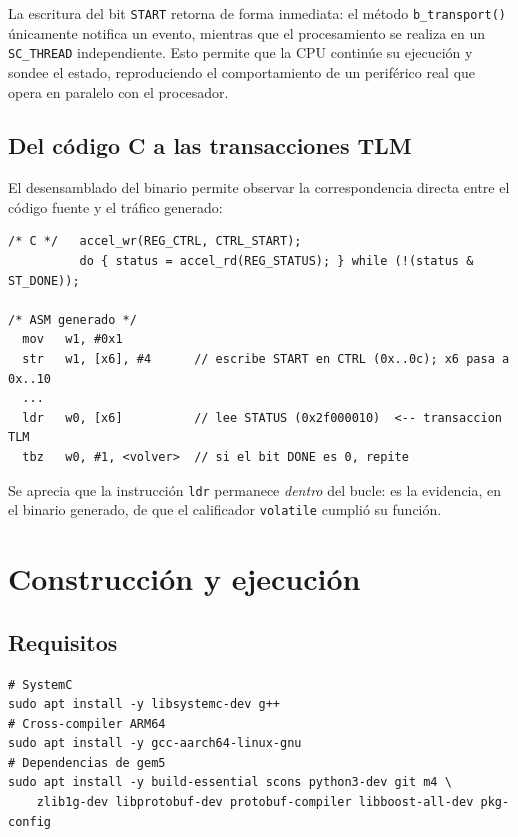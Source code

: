 \documentclass[11pt,letterpaper]{article}
\begin{document}
La escritura del bit \texttt{START} retorna de forma inmediata: el método
\texttt{b\_transport()} únicamente notifica un evento, mientras que el
procesamiento se realiza en un \texttt{SC\_THREAD} independiente. Esto permite
que la CPU continúe su ejecución y sondee el estado, reproduciendo el
comportamiento de un periférico real que opera en paralelo con el procesador.

\subsection{Del código C a las transacciones TLM}

El desensamblado del binario permite observar la correspondencia directa entre
el código fuente y el tráfico generado:

\begin{lstlisting}[style=consola,caption={Bucle de sondeo: codigo C y ensamblador ARM64 generado.}]
/* C */   accel_wr(REG_CTRL, CTRL_START);
          do { status = accel_rd(REG_STATUS); } while (!(status & ST_DONE));

/* ASM generado */
  mov   w1, #0x1
  str   w1, [x6], #4      // escribe START en CTRL (0x..0c); x6 pasa a 0x..10
  ...
  ldr   w0, [x6]          // lee STATUS (0x2f000010)  <-- transaccion TLM
  tbz   w0, #1, <volver>  // si el bit DONE es 0, repite
\end{lstlisting}

Se aprecia que la instrucción \texttt{ldr} permanece \emph{dentro} del bucle: es
la evidencia, en el binario generado, de que el calificador \texttt{volatile}
cumplió su función.

\section{Construcción y ejecución}

\subsection{Requisitos}

\begin{lstlisting}[style=shstyle,caption={Dependencias del entorno.}]
# SystemC
sudo apt install -y libsystemc-dev g++
# Cross-compiler ARM64
sudo apt install -y gcc-aarch64-linux-gnu
# Dependencias de gem5
sudo apt install -y build-essential scons python3-dev git m4 \
    zlib1g-dev libprotobuf-dev protobuf-compiler libboost-all-dev pkg-config
\end{lstlisting}
\end{document}
